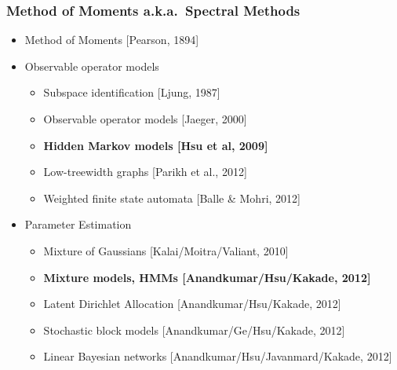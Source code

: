 \documentclass[xcolor={svgnames}]{beamer}
\begin{document}
\begin{frame}
  \frametitle{Method of Moments a.k.a.\ Spectral Methods}
  \begin{itemize}
    \item<+-> Method of Moments [Pearson, 1894]
    \item<+-> Observable operator models
    \begin{itemize}
      \item Subspace identification [Ljung, 1987]
      \item Observable operator models [Jaeger, 2000]
      \item {\bf Hidden Markov models [Hsu et al, 2009]}
      \item Low-treewidth graphs [Parikh et al., 2012]
      \item Weighted finite state automata [Balle \& Mohri, 2012]
    \end{itemize}
     \item<+-> Parameter Estimation
  \begin{itemize}
    \item Mixture of Gaussians [Kalai/Moitra/Valiant, 2010]
    \item {\bf Mixture models, HMMs [Anandkumar/Hsu/Kakade, 2012]}
    \item Latent Dirichlet Allocation [Anandkumar/Hsu/Kakade, 2012]
    \item Stochastic block models [Anandkumar/Ge/Hsu/Kakade, 2012]
    \item Linear Bayesian networks [Anandkumar/Hsu/Javanmard/Kakade, 2012]
  \end{itemize}
  \end{itemize}
\end{frame}
\end{document}

